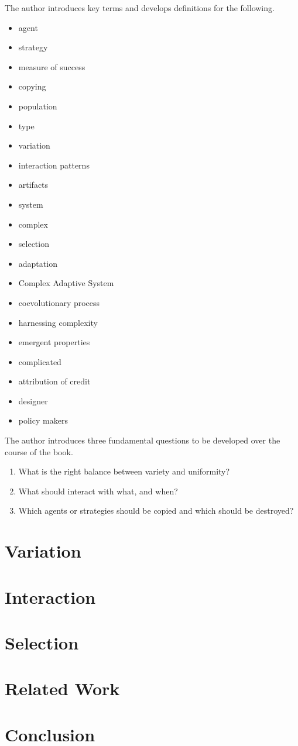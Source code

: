 \documentclass[jou,apacite]{apa6}
\begin{document}
The author introduces key terms and develops definitions for the following.
\begin{itemize}
  \item agent
  \item strategy
  \item measure of success
  \item copying
  \item population
  \item type
  \item variation
  \item interaction patterns
  \item artifacts
  \item system
  \item complex
  \item selection
  \item adaptation
  \item Complex Adaptive System
  \item coevolutionary process
  \item harnessing complexity
  \item emergent properties
  \item complicated
  \item attribution of credit
  \item designer
  \item policy makers
\end{itemize}

The author introduces three fundamental questions to be developed over the course of the book.
\begin{enumerate}
  \item What is the right balance between variety and uniformity?
  \item What should interact with what, and when?
  \item Which agents or strategies should be copied and which should be destroyed?
\end{enumerate}

\section{Variation}

\section{Interaction}

\section{Selection}

\section{Related Work}

\section{Conclusion}


\end{document}

